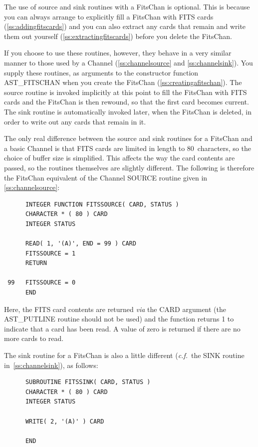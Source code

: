 \documentclass[twoside,11pt]{article}
\newcommand{\htmlref}[2]{#1}
\newcommand{\secref}[1]{\S\ref{#1}}
\renewcommand{\secref}[1]{\ref{#1}}
\begin{document}
The use of source and sink routines with a \htmlref{FitsChan}{FitsChan} is optional. This
is because you can always arrange to explicitly fill a FitsChan with
FITS cards (\secref{ss:addingfitscards}) and you can also extract any
cards that remain and write them out yourself
(\secref{ss:extractingfitscards}) before you delete the FitsChan.

If you choose to use these routines, however, they behave in a very
similar manner to those used by a \htmlref{Channel}{Channel} (\secref{ss:channelsource}
and \secref{ss:channelsink}). You supply these routines, as arguments
to the constructor function \htmlref{AST\_FITSCHAN}{AST_FITSCHAN} when you create the FitsChan
(\secref{ss:creatingafitschan}). The source routine is invoked
implicitly at this point to fill the FitsChan with FITS cards and the
FitsChan is then rewound, so that the first card becomes current. The
sink routine is automatically invoked later, when the FitsChan is
deleted, in order to write out any cards that remain in it.


The only real difference between the source and sink routines for a
FitsChan and a basic Channel is that FITS cards are limited in length
to 80~characters, so the choice of buffer size is simplified.  This
affects the way the card contents are passed, so the routines
themselves are slightly different.  The following is therefore the
FitsChan equivalent of the Channel SOURCE routine given in
\secref{ss:channelsource}:

\small
\begin{verbatim}
      INTEGER FUNCTION FITSSOURCE( CARD, STATUS )
      CHARACTER * ( 80 ) CARD
      INTEGER STATUS

      READ( 1, '(A)', END = 99 ) CARD
      FITSSOURCE = 1
      RETURN

 99   FITSSOURCE = 0
      END
\end{verbatim}
\normalsize

Here, the FITS card contents are returned {\em{via}} the CARD argument
(the \htmlref{AST\_PUTLINE}{AST_PUTLINE} routine should not be used) and the function returns
1 to indicate that a card has been read. A value of zero is returned
if there are no more cards to read.

The sink routine for a FitsChan is also a little different
({\em{c.f.}}\ the SINK routine in~\secref{ss:channelsink}), as
follows:

\small
\begin{verbatim}
      SUBROUTINE FITSSINK( CARD, STATUS )
      CHARACTER * ( 80 ) CARD
      INTEGER STATUS

      WRITE( 2, '(A)' ) CARD

      END
\end{verbatim}
\normalsize
\end{document}
